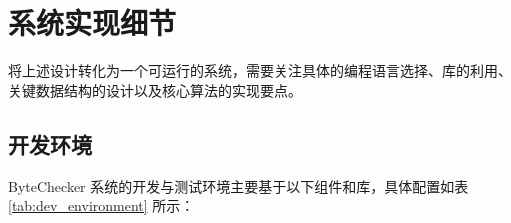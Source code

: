 \documentclass[print, master, vlined, timesmath]{DissertUESTC}
\begin{document}





\section{系统实现细节}

将上述设计转化为一个可运行的系统，需要关注具体的编程语言选择、库的利用、关键数据结构的设计以及核心算法的实现要点。

\subsection{开发环境}

ByteChecker 系统的开发与测试环境主要基于以下组件和库，具体配置如表 \ref{tab:dev_environment} 所示：
\end{document}

